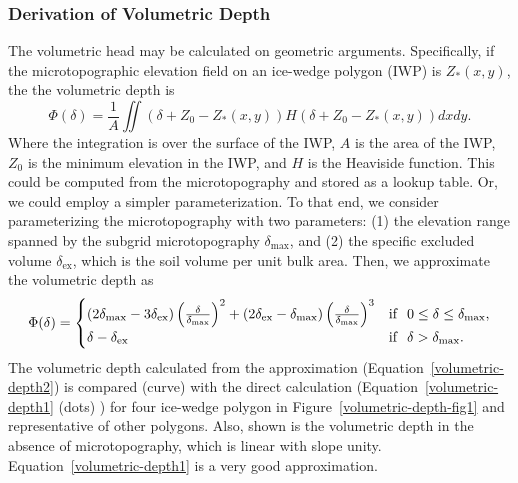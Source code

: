 \documentclass[review,11pt]{elsarticle}
\begin{document}
\subsubsection{Derivation of Volumetric Depth}
The volumetric head may be calculated on geometric arguments. Specifically, if the microtopographic elevation field on an ice-wedge polygon (IWP) is $Z_*(x,y)$, the the volumetric depth is
\begin{equation}\label{volumetric-depth1}
\Phi (\delta) = \frac{1}{A} \iint \left( \delta + Z_0 - Z_*(x,y) \right ) H \left( \delta + Z_0 - Z_*(x,y) \right ) dx dy.
\end{equation}
Where the integration is over the surface of the IWP, $A$ is the area of the IWP, $Z_0$ is the minimum elevation in the IWP, and $H$ is the Heaviside function. This could be computed from the microtopography and stored as a lookup table. Or, we could employ a simpler parameterization. To that end, we consider parameterizing the microtopography with two parameters: (1) the elevation range spanned by the subgrid microtopography $\delta_\text{max}$, and (2) the specific excluded volume $\delta_\text{ex}$, which is the soil volume per unit bulk area. Then, we approximate the volumetric depth as
\begin{equation}\label{volumetric-depth2}
\Phi (\delta) =
\begin{cases} (2 \delta_\text{max} - 3 \delta_\text{ex}) \left(\frac{\delta}{\delta_\text{max}} \right )^2 + (2 \delta_\text{ex} -  \delta_\text{max}) \left(\frac{\delta}{\delta_\text{max}} \right )^3 & \text{if} \hskip 0.1in 0 \leq \delta \leq \delta_\text{max}, \\
\delta - \delta_\text{ex} & \text{if} \hskip .1in \delta > \delta_\text{max}.
\end{cases}
\end{equation}
The volumetric depth calculated from the approximation (Equation~\ref{volumetric-depth2}) is compared (curve) with the direct calculation (Equation~\ref{volumetric-depth1} (dots) ) for four ice-wedge polygon in Figure~\ref{volumetric-depth-fig1} and representative of other polygons. Also, shown is the volumetric depth in the absence of microtopography, which is linear with slope unity. Equation~\ref{volumetric-depth1} is a very good approximation.
\end{document}
